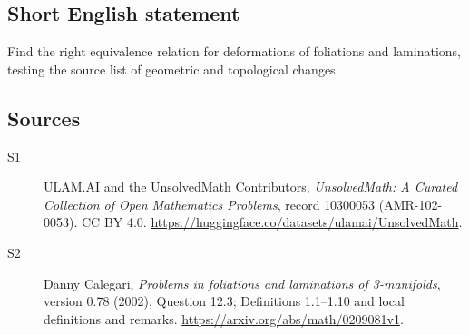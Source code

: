 \documentclass[11pt]{article}
\begin{document}
\subsection{Short English statement}
Find the right equivalence relation for deformations of foliations and laminations, testing the source list of geometric and topological changes.
\subsection{Sources}
\begin{description}
\item[\hypertarget{source:10300053:1}{S1}] ULAM.AI and the UnsolvedMath Contributors, \emph{UnsolvedMath: A Curated Collection of Open Mathematics Problems}, record 10300053 (AMR-102-0053). CC BY 4.0. \url{https://huggingface.co/datasets/ulamai/UnsolvedMath}.
\item[\hypertarget{source:10300053:2}{S2}] Danny Calegari, \emph{Problems in foliations and laminations of 3-manifolds}, version 0.78 (2002), Question 12.3; Definitions 1.1--1.10 and local definitions and remarks. \url{https://arxiv.org/abs/math/0209081v1}.
\end{description}
\label{end:10300053}
\end{document}
